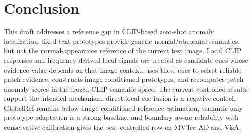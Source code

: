 \section{Conclusion}
\label{sec:conclusion}

This draft addresses a reference gap in CLIP-based zero-shot anomaly
localization: fixed text prototypes provide generic normal/abnormal semantics,
but not the normal-appearance reference of the current test image. Local CLIP
responses and frequency-derived local signals are treated as candidate cues
whose evidence value depends on that image context. \method{} uses these cues
to select reliable patch evidence, constructs image-conditioned prototypes, and
recomputes patch anomaly scores in the frozen CLIP semantic space. The current
controlled results support the intended mechanism: direct local-cue fusion is a
negative control, GlobalRef remains below image-conditioned reference
estimation, semantic-only prototype adaptation is a strong baseline, and
boundary-aware reliability with conservative calibration gives the best
controlled row on MVTec AD and VisA.
